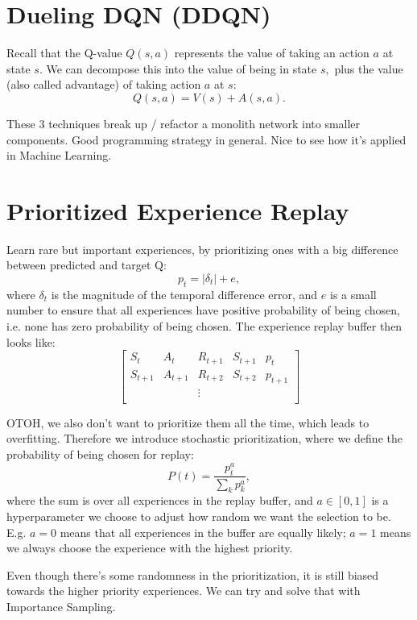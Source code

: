\documentclass[20pt]{extarticle}
\theoremstyle{plain}
\theoremstyle{definition}
\theoremstyle{remark}
\newcommand{\0}{\varnothing}
\newcommand{\<}{\langle}
\renewcommand{\>}{\rangle}
\begin{document}
\section{Dueling DQN (DDQN)}

Recall that the Q-value $ Q(s, a) $ represents the value of taking an action $ a
$ at state $ s. $ We can decompose this into the value of being in state $ s, $
plus the value (also called advantage) of taking action $ a $ at $ s: $ $$
  Q(s, a) = V(s) + A(s, a).
$$

These 3 techniques break up / refactor a monolith network into smaller components. Good programming strategy in general. Nice to see how it's applied in Machine Learning.

\section{Prioritized Experience Replay}

Learn rare but important experiences, by prioritizing ones with a big difference between predicted and target Q: $$
p _ { t } = \left| \delta _ { t } \right| + e,
$$
where $ \delta_t $ is the magnitude of the temporal difference error, and $ e $ is a small number to ensure that all experiences have positive probability of being chosen, i.e. none has zero probability of being chosen. The experience replay buffer then looks like: $$
\begin{bmatrix}
S_t & A_t & R_{t+1} & S_{t+1} & p_t \\
S_{t+1} & A_{t+1} & R_{t+2} & S_{t+2} & p_{t+1} \\
& & \vdots & & \\
\end{bmatrix}
$$

OTOH, we also don't want to prioritize them all the time, which leads to overfitting. Therefore we introduce stochastic prioritization, where we define the probability of being chosen for replay: $$
P(t) = \frac{p_t^a}{\sum_k p_k^a},
$$
where the sum is over all experiences in the replay buffer, and $ a \in [0, 1] $ is a hyperparameter we choose to adjust how random we want the selection to be. E.g. $ a = 0 $ means that all experiences in the buffer are equally likely; $ a = 1 $ means we always choose the experience with the highest priority.

Even though there's some randomness in the prioritization, it is still biased towards the higher priority experiences. We can try and solve that with Importance Sampling.
\end{document}

